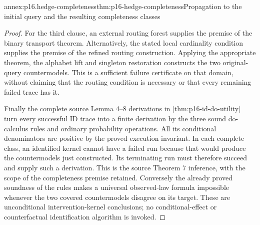 \begin{annexitem}{annex:p16.hedge-completeness}{thm:p16-hedge-completeness}{Propagation to the initial query and the resulting completeness classes}
\begin{proof}
For the third clause, an external routing forest supplies the premise
of the binary transport theorem. Alternatively, the stated local
cardinality condition supplies the premise of the refined routing
construction. Applying the appropriate theorem, the alphabet lift
and singleton restoration constructs the two original-query
countermodels. This is a sufficient failure
certificate on that domain, without claiming that the routing
condition is necessary or that every remaining failed trace has it.

Finally the complete source Lemma 4--8 derivations in
\cref{thm:p16-id-do-utility} turn every successful ID trace into
a finite derivation by the three sound do-calculus rules and ordinary
probability operations. All its conditional denominators are positive
by the proved execution invariant. In each complete class, an
identified kernel cannot have a failed run because that would
produce the countermodels just constructed. Its terminating run
must therefore succeed and supply such a derivation. This is the
source Theorem 7 inference, with the scope of the completeness
premise retained. Conversely the already proved soundness of the
rules makes a universal observed-law formula impossible whenever
the two covered countermodels disagree on its target. These are
unconditional intervention-kernel conclusions; no conditional-effect
or counterfactual identification algorithm is invoked.
\end{proof}
\end{annexitem}

